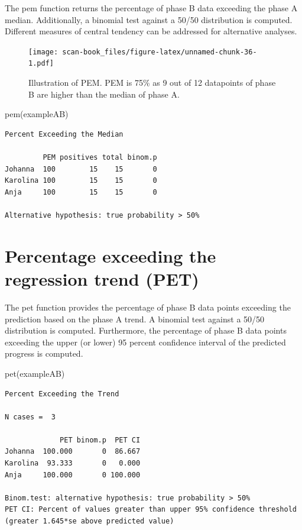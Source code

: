 \documentclass[
]{book}
\newenvironment{Shaded}{\begin{snugshade}}{\end{snugshade}}
\newcommand{\FunctionTok}[1]{\textcolor[rgb]{0.00,0.00,0.00}{#1}}
\newcommand{\NormalTok}[1]{#1}
\begin{document}
The pem function returns the percentage of phase B data exceeding the phase A median. Additionally, a binomial test against a 50/50 distribution is computed. Different measures of central tendency can be addressed for alternative analyses.

\begin{figure}
\centering
\texttt{[image: scan-book\_files/figure-latex/unnamed-chunk-36-1.pdf]}
\caption{\label{fig:unnamed-chunk-36}Illustration of PEM. PEM is 75\% as 9 out of 12 datapoints of phase B are higher than the median of phase A.}
\end{figure}

\begin{Shaded}
\begin{Highlighting}[]
\FunctionTok{pem}\NormalTok{(exampleAB)}
\end{Highlighting}
\end{Shaded}

\begin{verbatim}
Percent Exceeding the Median

         PEM positives total binom.p
Johanna  100        15    15       0
Karolina 100        15    15       0
Anja     100        15    15       0

Alternative hypothesis: true probability > 50%
\end{verbatim}

\hypertarget{percentage-exceeding-the-regression-trend-pet}{%
\section{Percentage exceeding the regression trend (PET)}\label{percentage-exceeding-the-regression-trend-pet}}

The pet function provides the percentage of phase B data points exceeding the prediction based on the phase A trend. A binomial test against a 50/50 distribution is computed. Furthermore, the percentage of phase B data points exceeding the upper (or lower) 95 percent confidence interval of the predicted progress is computed.

\begin{Shaded}
\begin{Highlighting}[]
\FunctionTok{pet}\NormalTok{(exampleAB)}
\end{Highlighting}
\end{Shaded}

\begin{verbatim}
Percent Exceeding the Trend

N cases =  3 

             PET binom.p  PET CI
Johanna  100.000       0  86.667
Karolina  93.333       0   0.000
Anja     100.000       0 100.000

Binom.test: alternative hypothesis: true probability > 50%
PET CI: Percent of values greater than upper 95% confidence threshold (greater 1.645*se above predicted value)
\end{verbatim}
\end{document}
